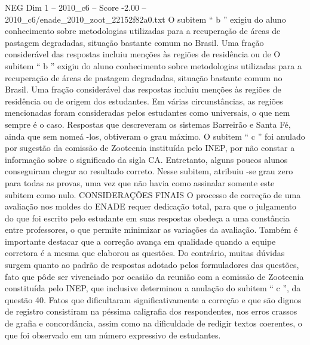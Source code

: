 \begin{textsample}{NEG Dim 1 – 2010\_c6 – Score -2.00 – 2010\_c6/enade\_2010\_zoot\_22152f82a0.txt}
O subitem “ b ” exigiu do aluno conhecimento sobre metodologias utilizadas para a recuperação de áreas de pastagem degradadas, situação bastante comum no Brasil.
Uma fração considerável das respostas incluiu menções às regiões de residência ou de O subitem “ b ” exigiu do aluno conhecimento sobre metodologias utilizadas para a recuperação de áreas de pastagem degradadas, situação bastante comum no Brasil.
Uma fração considerável das respostas incluiu menções às regiões de residência ou de origem dos estudantes.
Em várias circunstâncias, as regiões mencionadas foram consideradas pelos estudantes como universais, o que nem sempre é o caso.
Respostas que descreveram os sistemas Barreirão e Santa Fé, ainda que sem nomeá -los, obtiveram o grau máximo.
O subitem “ c ” foi anulado por sugestão da comissão de Zootecnia instituída pelo INEP, por não constar a informação sobre o significado da sigla CA.
Entretanto, alguns poucos alunos conseguiram chegar ao resultado correto.
Nesse subitem, atribuiu -se grau zero para todas as provas, uma vez que não havia como assinalar somente este subitem como nulo.
CONSIDERAÇÕES FINAIS O processo de correção de uma avaliação nos moldes do ENADE requer dedicação total, para que o julgamento do que foi escrito pelo estudante em suas respostas obedeça a uma constância entre professores, o que permite minimizar as variações da avaliação.
Também é importante destacar que a correção avança em qualidade quando a equipe corretora é a mesma que elaborou as questões.
Do contrário, muitas dúvidas surgem quanto ao padrão de respostas adotado pelos formuladores das questões, fato que pôde ser vivenciado por ocasião da reunião com a comissão de Zootecnia constituída pelo INEP, que inclusive determinou a anulação do subitem “ c ”, da questão 40.
Fatos que dificultaram significativamente a correção e que são dignos de registro consistiram na péssima caligrafia dos respondentes, nos erros crassos de grafia e concordância, assim como na dificuldade de redigir textos coerentes, o que foi observado em um número expressivo de estudantes.

\end{textsample}
